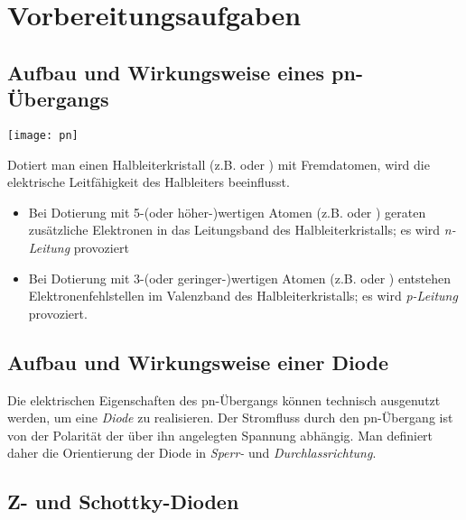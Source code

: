 \documentclass[a4paper, 12pt]{article}
\begin{document}
  
  \clearpage
  \setcounter{page}{1}

\section{Vorbereitungsaufgaben}

\subsection{Aufbau und Wirkungsweise eines pn-Übergangs}
\begin{center}
  \texttt{[image: pn]}
\end{center}

\noindent Dotiert man einen Halbleiterkristall (z.B.  oder ) mit
Fremdatomen, wird die elektrische Leitfähigkeit des Halbleiters beeinflusst.

\begin{itemize}
\item{
    Bei Dotierung mit
    5-(oder höher-)wertigen Atomen (z.B.  oder ) geraten zusätzliche
    Elektronen in das Leitungsband des Halbleiterkristalls; es wird \emph{n-Leitung}
    provoziert
  }

\item{
    Bei Dotierung mit
    3-(oder geringer-)wertigen Atomen (z.B.  oder ) entstehen
    Elektronenfehlstellen im Valenzband des Halbleiterkristalls; es wird \emph{p-Leitung}
    provoziert.
  }
\end{itemize}



\subsection{Aufbau und Wirkungsweise einer Diode}
Die elektrischen Eigenschaften des pn-Übergangs können technisch ausgenutzt werden, um eine \emph{Diode} zu realisieren. Der Stromfluss durch den pn-Übergang ist von der Polarität der über ihn angelegten Spannung abhängig. Man definiert daher die Orientierung der Diode in \emph{Sperr-} und \emph{Durchlassrichtung}.


\subsection{Z- und Schottky-Dioden}

\end{document}
